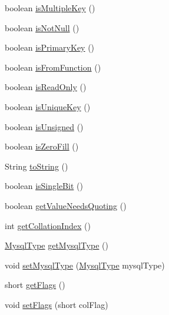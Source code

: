 \begin{DoxyCompactItemize}
boolean \mbox{\hyperlink{classcom_1_1mysql_1_1cj_1_1result_1_1_field_af698846f19eafaec7ac9deba0322ff82}{is\+Multiple\+Key}} ()
\item 
boolean \mbox{\hyperlink{classcom_1_1mysql_1_1cj_1_1result_1_1_field_aaaa0c89511d524c80f11ef63517a6c72}{is\+Not\+Null}} ()
\item 
boolean \mbox{\hyperlink{classcom_1_1mysql_1_1cj_1_1result_1_1_field_a2111351d210bc633b9427c32b648c20f}{is\+Primary\+Key}} ()
\item 
boolean \mbox{\hyperlink{classcom_1_1mysql_1_1cj_1_1result_1_1_field_ae18abd216472b2b4aa1101a550f05a62}{is\+From\+Function}} ()
\item 
boolean \mbox{\hyperlink{classcom_1_1mysql_1_1cj_1_1result_1_1_field_a623734609cfd77c839d9b4683c59ae5a}{is\+Read\+Only}} ()
\item 
boolean \mbox{\hyperlink{classcom_1_1mysql_1_1cj_1_1result_1_1_field_a8a10debd852eaef1d98795e3c6c4f9d1}{is\+Unique\+Key}} ()
\item 
boolean \mbox{\hyperlink{classcom_1_1mysql_1_1cj_1_1result_1_1_field_ad94f6ae349aa8ed1bf21de82ea9e4182}{is\+Unsigned}} ()
\item 
boolean \mbox{\hyperlink{classcom_1_1mysql_1_1cj_1_1result_1_1_field_a38ae931ee21f8ca383d32f398177af1b}{is\+Zero\+Fill}} ()
\item 
String \mbox{\hyperlink{classcom_1_1mysql_1_1cj_1_1result_1_1_field_af304ee882a3173448ede28acf7b6307e}{to\+String}} ()
\item 
boolean \mbox{\hyperlink{classcom_1_1mysql_1_1cj_1_1result_1_1_field_a6d593058ba320c3b92635bebcc0a42aa}{is\+Single\+Bit}} ()
\item 
boolean \mbox{\hyperlink{classcom_1_1mysql_1_1cj_1_1result_1_1_field_a74e13962df3c939b8933f82188227b6d}{get\+Value\+Needs\+Quoting}} ()
\item 
int \mbox{\hyperlink{classcom_1_1mysql_1_1cj_1_1result_1_1_field_a21ede1f5c068e7152d0a8eda13f47354}{get\+Collation\+Index}} ()
\item 
\mbox{\hyperlink{enumcom_1_1mysql_1_1cj_1_1_mysql_type}{Mysql\+Type}} \mbox{\hyperlink{classcom_1_1mysql_1_1cj_1_1result_1_1_field_abc94eddbef7e1095cc083550edf4b0d2}{get\+Mysql\+Type}} ()
\item 
void \mbox{\hyperlink{classcom_1_1mysql_1_1cj_1_1result_1_1_field_a00ee854a2c92e5bf52d2a9c58a099ba6}{set\+Mysql\+Type}} (\mbox{\hyperlink{enumcom_1_1mysql_1_1cj_1_1_mysql_type}{Mysql\+Type}} mysql\+Type)
\item 
short \mbox{\hyperlink{classcom_1_1mysql_1_1cj_1_1result_1_1_field_a30c42420744a39c420b7b0cade7f33b9}{get\+Flags}} ()
\item 
void \mbox{\hyperlink{classcom_1_1mysql_1_1cj_1_1result_1_1_field_a5ff2e6ab274eb68345cc1422d571ff4a}{set\+Flags}} (short col\+Flag)
\end{DoxyCompactItemize}


